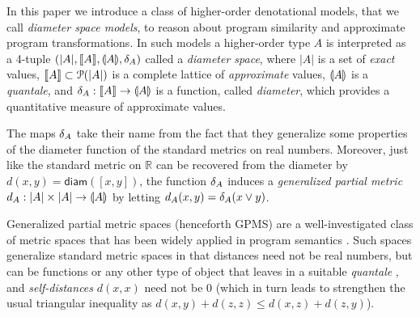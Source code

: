 In this paper we introduce a class of higher-order denotational models, that we call \emph{diameter space models}, to reason about program similarity and approximate program transformations.
In such models a higher-order type $A$ is interpreted as a 4-tuple $(|A|, \llbracket A \rrbracket, \llparenthesis A \rrparenthesis, \delta_{A})$ called a \emph{diameter space}, where $|A|$ is a set of \emph{exact} values, $\llbracket A \rrbracket\subset \mathcal P(|A|)$ is a complete lattice of \emph{approximate} values, $\llparenthesis A \rrparenthesis$ is a \emph{quantale}, and $\delta_{A}: \llbracket A \rrbracket\to \llparenthesis A \rrparenthesis$ is a function, called \emph{diameter}, which provides a quantitative measure of approximate values.





The maps $\delta_{A}$ take their name from the fact that they  
 generalize some properties of the diameter function of the standard metrics on real numbers. Moreover, just like the standard metric on $\mathbb R$ can be recovered from the diameter by $d(x,y)=\mathsf{diam}([x,y])$, the function $\delta_{A}$ induces a \emph{generalized partial metric} $d_{A}:|A|\times |A|\to \llparenthesis A \rrparenthesis$ by letting $d_{A}(x,y)=\delta_{A}(x\vee y)$. 


Generalized partial metric spaces (henceforth GPMS) are a well-investigated class of metric spaces that has been widely applied in program semantics \cite{bkmp:partial-metrics, Bukatin1997, doi:10.1111/j.1749-6632.1994.tb44144.x, Schellekens2004, Samet:2013aa, Stubbe2018, HE201999}. 
Such spaces generalize standard metric spaces in that distances
need not be real numbers, but can be functions or any other type of object that leaves in a suitable \emph{quantale} \cite{Hofmann2014}, and \emph{self-distances} $d(x,x)$ need not be $0$ (which in turn leads to strengthen the usual triangular inequality as $d(x,y) + d(z,z)\leq d(x,z)+d(z,y)$).




